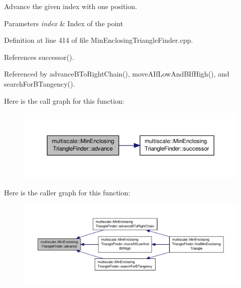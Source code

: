 Advance the given index with one position. 


\begin{DoxyParams}{Parameters}
{\em index} & Index of the point \\
\hline
\end{DoxyParams}


Definition at line 414 of file Min\-Enclosing\-Triangle\-Finder.\-cpp.



References successor().



Referenced by advance\-B\-To\-Right\-Chain(), move\-A\-If\-Low\-And\-B\-If\-High(), and search\-For\-B\-Tangency().



Here is the call graph for this function\-:\nopagebreak
\begin{figure}[H]
\begin{center}
\leavevmode
\includegraphics[width=350pt]{classmultiscale_1_1MinEnclosingTriangleFinder_af52c24da93e4660f043dbb0f92594a19_cgraph}
\end{center}
\end{figure}




Here is the caller graph for this function\-:\nopagebreak
\begin{figure}[H]
\begin{center}
\leavevmode
\includegraphics[width=350pt]{classmultiscale_1_1MinEnclosingTriangleFinder_af52c24da93e4660f043dbb0f92594a19_icgraph}
\end{center}
\end{figure}


